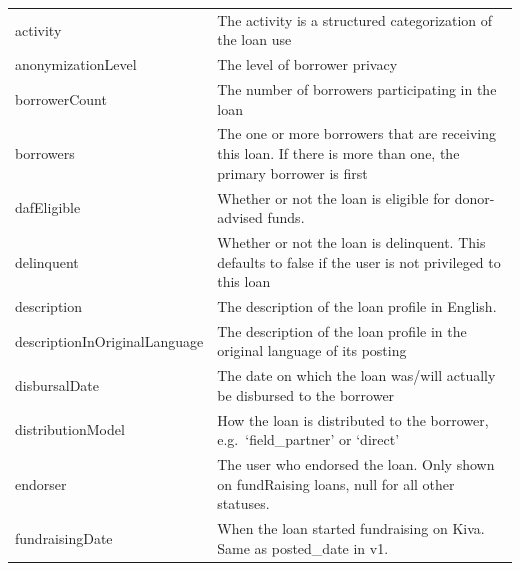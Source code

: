 \begin{longtable}{|p{}|p{}|}
    activity                             & The activity is a structured categorization of the loan
    use                                                                                                      \\
    anonymizationLevel                   & The level of borrower privacy                                     \\
    borrowerCount                        & The number of borrowers participating in the loan                 \\
    borrowers                            & The one or more borrowers that are receiving this loan. If
    there is more than one, the primary borrower is first                                                    \\
    dafEligible                          & Whether or not the loan is eligible for donor-advised
    funds.                                                                                                   \\
    delinquent                           & Whether or not the loan is delinquent. This defaults to
    false if the user is not privileged to this loan                                                         \\
    description                          & The description of the loan profile in English.                   \\
    descriptionInOriginalLanguage        & The description of the loan profile in
    the original language of its posting                                                                     \\
    disbursalDate                        & The date on which the loan was/will actually be
    disbursed to the borrower                                                                                \\
    distributionModel                    & How the loan is distributed to the borrower,
    e.g.~`field\_partner' or `direct'                                                                        \\
    endorser                             & The user who endorsed the loan. Only shown on fundRaising
    loans, null for all other statuses.                                                                      \\
    fundraisingDate                      & When the loan started fundraising on Kiva. Same as
    posted\_date in v1.                                                                                      \\

\end{longtable}
